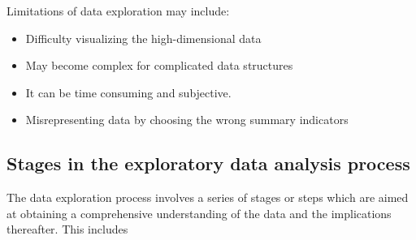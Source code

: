 \documentclass[
]{book}
\begin{document}
Limitations of data exploration may include:

\begin{itemize}
\item
  Difficulty visualizing the high-dimensional data
\item
  May become complex for complicated data structures
\item
  It can be time consuming and subjective.
\item
  Misrepresenting data by choosing the wrong summary indicators
\end{itemize}

\subsection{Stages in the exploratory data analysis process}\label{stages-in-the-exploratory-data-analysis-process}

The data exploration process involves a series of stages or steps which are aimed at obtaining a comprehensive understanding of the data and the implications thereafter. This includes
\end{document}
